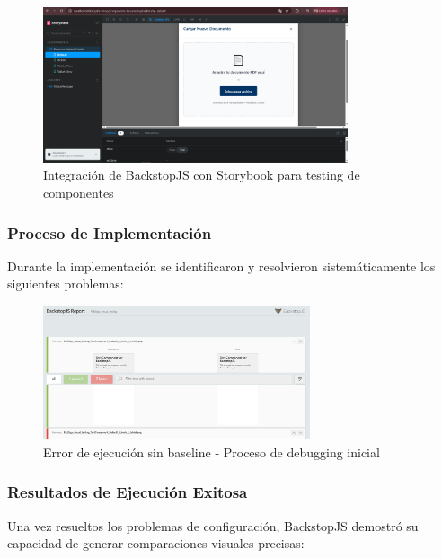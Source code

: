 \documentclass{article}
\begin{document}
\begin{figure}[H]
\centering
\includegraphics[width=0.8\textwidth]{BackStop/Storybook.png}
\caption{Integración de BackstopJS con Storybook para testing de componentes}
\label{fig:backstop-storybook}
\end{figure}

\subsubsection{Proceso de Implementación}
Durante la implementación se identificaron y resolvieron sistemáticamente los siguientes problemas:

\begin{figure}[H]
\centering
\includegraphics[width=0.7\textwidth]{BackStop/ejecucionSinBaseline.jpeg}
\caption{Error de ejecución sin baseline - Proceso de debugging inicial}
\label{fig:backstop-no-baseline}
\end{figure}

\subsubsection{Resultados de Ejecución Exitosa}
Una vez resueltos los problemas de configuración, BackstopJS demostró su capacidad de generar comparaciones visuales precisas:
\end{document}
